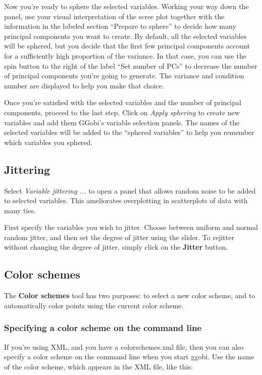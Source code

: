 \documentclass[11pt]{article}
\begin{document}
Now you're ready to sphere the selected variables.  Working your way down
the panel, use your visual interpretation of the scree plot together
with the information in the labeled section ``Prepare to sphere'' to
decide how many principal components you want to create.  By default,
all the selected variables will be sphered, but you decide that the first
few principal components account for a sufficiently high proportion of
the variance.  In that case, you can use the spin button to the right
of the label ``Set number of PCs'' to decrease the number of principal
components you're going to generate.  The variance and condition number
are displayed to help you make that choice.

Once you're satisfied with the selected variables and the number of
principal components, proceed to the last step.  Click on {\em Apply
sphering} to create new variables and add them GGobi's variable selection
panels.  The names of the selected variables will be added to the
``sphered variables'' to help you remember which variables you sphered.

\subsection{Jittering}

Select {\em Variable jittering ...} to open a panel that allows
random noise to be added to selected variables.  This ameliorates
overplotting in scatterplots of data with many ties.

First specify the variables you wish to jitter.  Choose between uniform
and normal random jitter, and then set the degree of jitter using the
slider.  To rejitter without changing the degree of jitter, simply click
on the {\bf Jitter} button.

\subsection{Color schemes}
\label{slbl:ColorSchemes}

The {\bf Color schemes} tool has two purposes: to select a
new color scheme, and to automatically color points
using the current color scheme.

\subsubsection{Specifying a color scheme on the command line}

If you're using XML, and you have a colorschemes.xml file, then
you can also specify a color scheme on the command line when you
start ggobi.  Use the name of the color scheme, which appears in
the XML file, like this:
\end{document}
